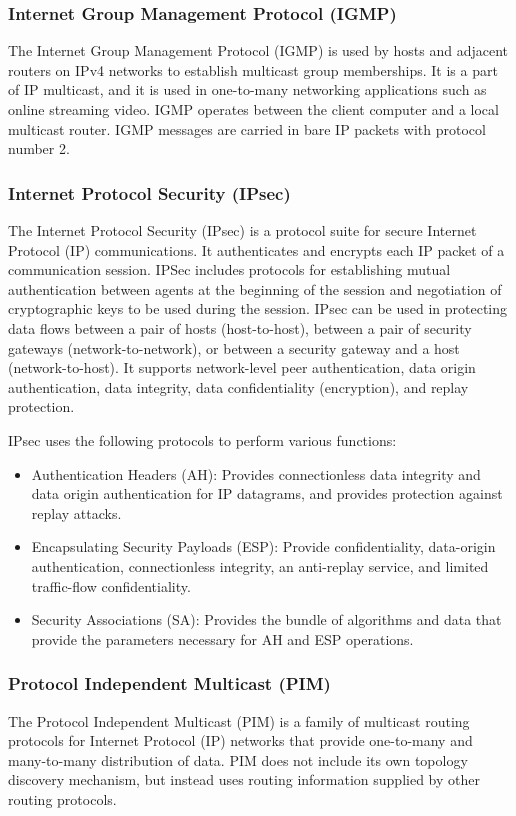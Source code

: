 \subsubsection*{Internet Group Management Protocol (IGMP)\cite{IGMP}}
The Internet Group Management Protocol (IGMP) is used by hosts and adjacent routers on IPv4 networks to establish multicast group memberships. It is a part of IP multicast, and it is used in one-to-many networking applications such as online streaming video. IGMP operates between the client computer and a local multicast router. IGMP messages are carried in bare IP packets with protocol number 2.

\subsubsection*{Internet Protocol Security (IPsec)\cite{IPsec}}
The Internet Protocol Security (IPsec) is a protocol suite for secure Internet Protocol (IP) communications. It authenticates and encrypts each IP packet of a communication session. IPSec includes protocols for establishing mutual authentication between agents at the beginning of the session and negotiation of cryptographic keys to be used during the session. IPsec can be used in protecting data flows between a pair of hosts (host-to-host), between a pair of security gateways (network-to-network), or between a security gateway and a host (network-to-host). It supports network-level peer authentication, data origin authentication, data integrity, data confidentiality (encryption), and replay protection.

IPsec uses the following protocols to perform various functions:

\begin{itemize}
\item Authentication Headers (AH): Provides connectionless data integrity and data origin authentication for IP datagrams, and provides protection against replay attacks.
\item Encapsulating Security Payloads (ESP): Provide confidentiality, data-origin authentication, connectionless integrity, an anti-replay service, and limited traffic-flow confidentiality.
\item Security Associations (SA): Provides the bundle of algorithms and data that provide the parameters necessary for AH and ESP operations.
\end{itemize}

\subsubsection*{Protocol Independent Multicast (PIM)\cite{PIMSM}\cite{PIMDM}}
The Protocol Independent Multicast (PIM) is a family of multicast routing protocols for Internet Protocol (IP) networks that provide one-to-many and many-to-many distribution of data. PIM does not include its own topology discovery mechanism, but instead uses routing information supplied by other routing protocols.

